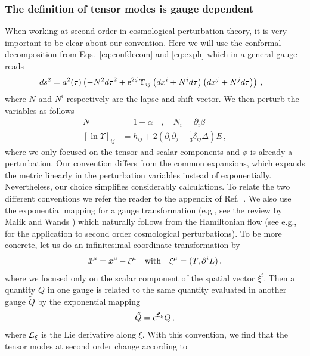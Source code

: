 \documentclass[a4paper,11pt]{article}
\numberwithin{equation}{section}
\begin{document}
\subsubsection{The definition of tensor modes is gauge dependent} When working at second order in cosmological perturbation theory, it is very important to be clear about our convention. Here we will use the conformal decomposition from Eqs.~\eqref{eq:confdecom} and \eqref{eq:exph} which in a general gauge reads
\begin{align}\label{eq:confdecom2}
ds^2&=a^2(\tau)\left(-N^2d\tau^2+{\rm e}^{2\phi}\Upsilon_{ij}\left(dx^i+N^id\tau\right)\left(dx^j+N^jd\tau\right)\right)\,,
\end{align}
where $N$ and $N^i$ respectively are the lapse and shift vector. We then perturb the variables as follows
\begin{align}\label{eq:confdecom3}
N&=1+\alpha\quad,\quad N_i=\partial_i\beta\\
\left[\ln\Upsilon\right]_{ij}&=h_{ij}+2\left(\partial_{i}\partial_{j}-\tfrac{1}{3}\delta_{ij}\Delta\right)E\label{eq:confdecomh}\,,
\end{align}
where we only focused on the tensor and scalar components and $\phi$ is already a perturbation. Our convention differs from the common expansions, which expands the metric linearly in the perturbation variables instead of exponentially. Nevertheless, our choice simplifies considerably calculations. To relate the two different conventions we refer the reader to the appendix of Ref.~\cite{Domenech:2020xin}. We also use the exponential mapping for a gauge transformation (e.g., see the review by Malik and Wands \cite{Malik:2008im}) which naturally follows from the Hamiltonian flow (see e.g.,~\cite{Domenech:2017ems} for the application to second order cosmological perturbations). To be more concrete, let us do an infinitesimal coordinate transformation by
\begin{align}
\tilde x^\mu=x^\mu-\xi^{\mu} \quad{\rm with}\quad \xi^\mu=(T,\partial^i L)\,,
\end{align}
where we focused only on the scalar component of the spatial vector $\xi^i$.
Then a quantity $Q$ in one gauge is related to the same quantity evaluated in another gauge $\tilde Q$ by the exponential mapping
\begin{align}\label{eq:gaugetransf}
\tilde Q=e^{\raisebox{0.1ex}{{-}}\hspace{-1.5mm}{\cal L}_\xi}Q\,,
\end{align}
where $\raisebox{0.2ex}{{--}}\hspace{-2mm}{\cal L}_\xi$ is the Lie derivative along $\xi$. With this convention, we find that the tensor modes at second order change according to
\end{document}
